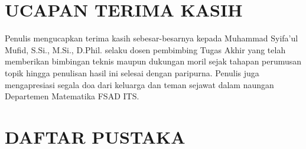 \documentclass[journal]{IEEEtran}
\theoremstyle{definition}
\theoremstyle{plain}
\begin{document}
\section*{UCAPAN TERIMA KASIH}
Penulis mengucapkan terima kasih sebesar-besarnya kepada Muhammad Syifa'ul Mufid, S.Si., M.Si., D.Phil. selaku dosen pembimbing Tugas Akhir yang telah memberikan bimbingan teknis maupun dukungan moril sejak tahapan perumusan topik hingga penulisan hasil ini selesai dengan paripurna. Penulis juga mengapresiasi segala doa dari keluarga dan teman sejawat dalam naungan Departemen Matematika FSAD ITS.

\section*{DAFTAR PUSTAKA}


\end{document}
